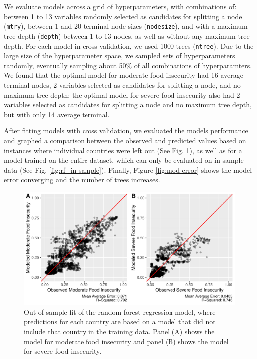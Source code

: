 \documentclass{article}
\begin{document}
We evaluate models across a grid of hyperparameters, with combinations of: between 1 to 13 variables randomly selected as candidates for splitting a node (\texttt{mtry}), between 1 and 20 terminal node sizes (\texttt{nodesize}), and with a maximum tree depth (\texttt{depth}) between 1 to 13 nodes, as well as without any maximum tree depth.  For each model in cross validation, we used 1000 trees (\texttt{ntree}).  Due to the large size of the hyperparameter space, we sampled sets of hyperparameters randomly, eventually sampling about 50\% of all combinations of hyperparamters.  We found that the optimal model for moderate food insecurity had 16 average terminal nodes, 2 variables selected as candidates for splitting a node, and no maximum tree depth; the optimal model for severe food insecurity also had 2 variables selected as candidates for splitting a node and no maximum tree depth, but with only 14 average terminal.

After fitting models with cross validation, we evaluated the models performance and graphed a comparison between the observed and predicted values based on instances where individual countries were left out (See Fig. \ref{fig:rf_out-sample}), as well as for a model trained on the entire dataset, which can only be evaluated on in-sample data (See Fig. \ref{fig:rf_in-sample}).  Finally, Figure \ref{fig:mod-error} shows the model error converging and the number of trees increases.

\begin{figure}[H]
  \centering
  \includegraphics[width=\linewidth]{img/out-sample_rf.pdf}
  \caption{Out-of-sample fit of the random forest regression model, where predictions for each country are based on a model that did not include that country in the training data. Panel (A) shows the model for moderate food insecurity and panel (B) shows the model for severe food insecurity.}
  \label{fig:rf_out-sample}
\end{figure}
\end{document}
